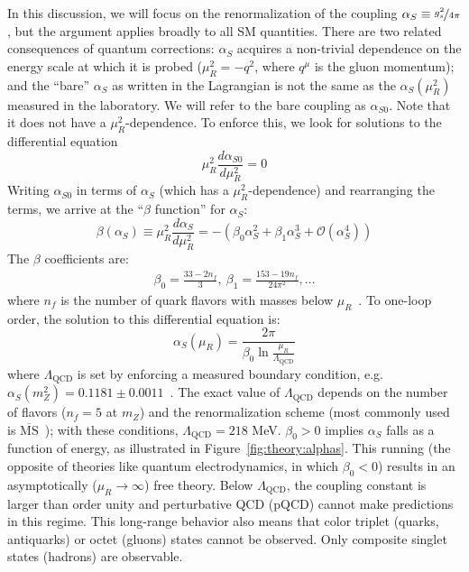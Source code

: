 In this discussion, we will focus on the renormalization of the coupling $\alpha_S \equiv \nicefrac{g_s^2}{4\pi}$, but the argument applies broadly to all SM quantities.
There are two related consequences of quantum corrections: $\alpha_S$ acquires a non-trivial dependence on the energy scale at which it is probed ($\mu_R^2 = -q^2$, where $q^\mu$ is the gluon momentum); and the ``bare'' $\alpha_S$ as written in the Lagrangian is not the same as the $\alpha_S(\mu_R^2)$ measured in the laboratory.
We will refer to the bare coupling as $\alpha_{S0}$. 
Note that it does not have a $\mu_R^2$-dependence.
To enforce this, we look for solutions to the differential equation
\begin{equation}
    \mu_R^2 \frac{d \alpha_{S0}}{d\mu_R^2} = 0
\end{equation}
Writing $\alpha_{S0}$ in terms of $\alpha_S$ (which has a $\mu_R^2$-dependence) and rearranging the terms, we arrive at the ``$\beta$ function'' for $\alpha_S$:
\begin{equation}
    \beta(\alpha_S) \equiv \mu_R^2 \frac{d \alpha_S}{d\mu_R^2} = -\left(\beta_0 \alpha_S^2 + \beta_1 \alpha_S^3 + \mathcal{O}(\alpha_S^4)\right)
\end{equation}
The $\beta$ coefficients are:
\begin{align}
    \beta_0 = \frac{33 - 2n_{f}}{3},~ 
    \beta_1 = \frac{153-19n_f}{24\pi^2} ,\dots
\end{align}
where $n_f$ is the number of quark flavors with masses below $\mu_R$~\cite{pdg,qcd1,qcd2}.
To one-loop order, the solution to this differential equation is:
\begin{equation}
    \alpha_S(\mu_R) = \frac{2\pi}{\beta_0 \ln \frac{\mu_R}{\Lambda_\mathrm{QCD}}}
\end{equation}
where $\Lambda_\mathrm{QCD}$ is set by enforcing a measured boundary condition, e.g. $\alpha_S(m_Z^2) = 0.1181 \pm 0.0011$~\cite{pdg}.
The exact value of $\Lambda_\mathrm{QCD}$ depends on the number of flavors ($n_f=5$ at $m_Z$) and the renormalization scheme (most commonly used is $\overline{\text{MS}}$~\cite{msbar}); with these conditions, $\Lambda_\mathrm{QCD} = 218$ MeV.
$\beta_0>0$ implies $\alpha_S$ falls as a function of energy, as illustrated in Figure~\ref{fig:theory:alphas}.
This running (the opposite of theories like quantum electrodynamics, in which $\beta_0<0$) results in an asymptotically ($\mu_R\rightarrow \infty$) free theory.
Below $\Lambda_\mathrm{QCD}$, the coupling constant is larger than order unity and perturbative QCD (pQCD) cannot make predictions in this regime.
This long-range behavior also means that color triplet (quarks, antiquarks) or octet (gluons) states cannot be observed. 
Only composite singlet states (hadrons) are observable. 


